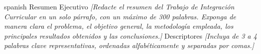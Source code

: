 \UTIResumenPagina
  {spanish}
  {Resumen Ejecutivo}
  {\textit{[Redacte el resumen del Trabajo de Integración Curricular en un solo párrafo, con un máximo de 300 palabras. Exponga de manera clara el problema, el objetivo general, la metodología empleada, los principales resultados obtenidos y las conclusiones.]}}
  {Descriptores}
  {\textit{[Incluya de 3 a 4 palabras clave representativas, ordenadas alfabéticamente y separadas por comas.]}}